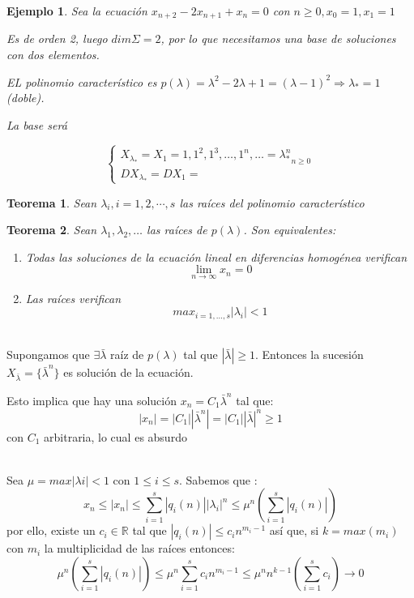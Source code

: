 \documentclass[11pt, a4paper]{article}
\makeatletter
\newif\IfInSansMode
\let\oldsf\sffamily
\renewcommand*{\sffamily}{\oldsf\mathversion{sans}\InSansModetrue}
\let\oldnorm\normalfont
\renewcommand*{\normalfont}{\oldnorm\InSansModefalse\mathversion{normal}}
\renewenvironment{proof}[1][\proofname] {\vspace{-15pt}\par\pushQED{\qed}\normalfont\topsep6\p@\@plus6\p@\relax\trivlist\item[\hskip\labelsep\it#1\@addpunct{.}]\ignorespaces}{\popQED\endtrivlist\@endpefalse}
\numberwithin{equation}{section}
\newcommand{\R}{\mathbb{R}}
\renewenvironment{proof}[1][\proofname] {\par\pushQED{\qed}\normalfont\topsep6\p@\@plus6\p@\relax\trivlist\item[\hskip\labelsep\itshape\sffamily#1\@addpunct{.}]\ignorespaces}{\popQED\endtrivlist\@endpefalse}
\theoremstyle{theorem-style}
\newtheorem{nth}{Teorema}[section]
\theoremstyle{definition-style}
\theoremstyle{remark-style}
\theoremstyle{example-style}
\newtheorem{ejemplo}{Ejemplo}[section]
\makeatother
\begin{document}
\begin{ejemplo}
  Sea la ecuación $x_{n+2} - 2x_{n+1} + x_n = 0$ con
  $n \geq 0, x_0 = 1, x_1 = 1$
	
  Es de orden 2, luego $dim \Sigma = 2$, por lo que necesitamos una base de
  soluciones con dos elementos.
	
  EL polinomio característico es
  $p(\lambda) = \lambda^2 - 2\lambda + 1 = (\lambda - 1)^2 \Rightarrow
  \lambda_{\ast} = 1$ (doble).
	
  La base será
	
	$$
	\begin{cases}
          X_{\lambda_{\ast}} = X_1 = {1, 1^2, 1^3, \hdots, 1^n, \hdots} = {\lambda_{\ast}^n}_{n \geq 0}\\
          DX_{\lambda_{\ast}} = DX_1 =
	\end{cases}
	$$
      \end{ejemplo}

\begin{nth}
	Sean $\lambda_i, i=1,2,\cdots,s$ las raíces del polinomio característico
\end{nth}


 \begin{nth}
        Sean $\lambda_{1}, \lambda_{2}, \hdots$ las raíces de $p(\lambda)$. Son
        equivalentes:
        \begin{enumerate}
        \item Todas las soluciones de la ecuación lineal en diferencias
          homogénea verifican $$\lim_{n \to \infty} x_{n} = 0$$
        \item Las raíces verifican $$max_{i=1,\hdots,s}|\lambda_{i}| < 1$$
        \end{enumerate}
      \end{nth}

\begin{proof}
	\boxed{\Rightarrow}\hfill \\
	Supongamos que $\exists \bar \lambda$ raíz de $p(\lambda)$ tal que $|\bar \lambda| \geq 1$. Entonces la sucesión $X_{\bar \lambda}=\{\bar \lambda ^n\}$ es solución de la ecuación.
	
	Esto implica que hay una solución $x_n = C_1 \bar \lambda ^n $ tal que:
	\[
	|x_n|=|C_1||\bar \lambda ^n | = |C_1| |\bar \lambda| ^n \geq 1
	\]
	con $C_1$ arbitraria, lo cual es absurdo
	
	\boxed{\Leftarrow}\hfill\\	
	Sea $\mu = max |\lambda i| < 1$ con $1 \leq i \leq s$.  Sabemos que :
	$$x_n \leq |x_n| \leq \sum_{i=1}^s|q_i(n)||\lambda_i|^n \leq \mu^n (\sum_{i=1}^s |q_i(n)|)$$
	por ello, existe un $c_i \in \R$ tal que $|q_i(n)| \leq c_i n^{m_i -1}$ así que, si $k = max (m_i)$ con $m_i$ la multiplicidad de las raíces entonces:
	\[
	\mu^n (\sum_{i=1}^s |q_i(n)|) \leq \mu^n \sum_{i=1}^s c_i n^{m_i -1} \leq \mu^n n^{k-1}(\sum_{i=1}^s c_i) \to 0
	\]
      \end{proof}
\end{document}
